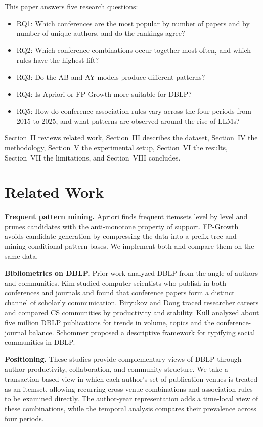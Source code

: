 ﻿\documentclass[conference]{IEEEtran}
\begin{document}
This paper answers five research questions:
\begin{itemize}
\item RQ1: Which conferences are the most popular by number of papers and by number of unique authors, and do the rankings agree?
\item RQ2: Which conference combinations occur together most often, and which rules have the highest lift?
\item RQ3: Do the AB and AY models produce different patterns?
\item RQ4: Is Apriori or FP-Growth more suitable for DBLP?
\item RQ5: How do conference association rules vary across the four periods from 2015 to 2025, and what patterns are observed around the rise of LLMs?
\end{itemize}

Section~II reviews related work, Section~III describes the dataset, Section~IV the methodology, Section~V the experimental setup, Section~VI the results, Section~VII the limitations, and Section~VIII concludes.

\section{Related Work}
\textbf{Frequent pattern mining.} Apriori \cite{apriori} finds frequent itemsets level by level and prunes candidates with the anti-monotone property of support. FP-Growth \cite{fpgrowth} avoids candidate generation by compressing the data into a prefix tree and mining conditional pattern bases. We implement both and compare them on the same data.

\textbf{Bibliometrics on DBLP.} Prior work analyzed DBLP from the angle of authors and communities. Kim \cite{kim} studied computer scientists who publish in both conferences and journals and found that conference papers form a distinct channel of scholarly communication. Biryukov and Dong \cite{biryukov} traced researcher careers and compared CS communities by productivity and stability. K\"ull \cite{kull} analyzed about five million DBLP publications for trends in volume, topics and the conference-journal balance. Schommer \cite{schommer} proposed a descriptive framework for typifying social communities in DBLP.

\textbf{Positioning.} These studies provide complementary views of DBLP through author productivity, collaboration, and community structure. We take a transaction-based view in which each author's set of publication venues is treated as an itemset, allowing recurring cross-venue combinations and association rules to be examined directly. The author-year representation adds a time-local view of these combinations, while the temporal analysis compares their prevalence across four periods.
\end{document}
